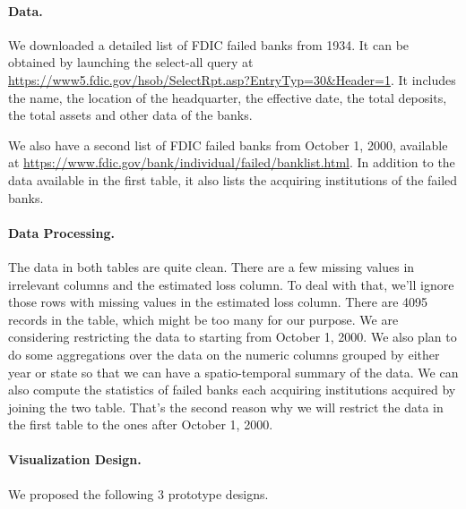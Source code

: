 \documentclass[11pt]{article}
\begin{document}
\paragraph{Data.}
We downloaded a detailed list of FDIC failed banks from 1934. It can be
obtained by launching the select-all query at
\url{https://www5.fdic.gov/hsob/SelectRpt.asp?EntryTyp=30&Header=1}. It
includes the name, the location of the headquarter, the effective date, the
total deposits, the total assets and other data of the banks.

We also have a second list of FDIC failed banks from October 1, 2000, available
at \url{https://www.fdic.gov/bank/individual/failed/banklist.html}. In
addition to the data available in the first table, it also lists the acquiring
institutions of the failed banks.

\paragraph{Data Processing.}
The data in both tables are quite clean. There are a few missing values in
irrelevant columns and the estimated loss column. To deal with that, we'll
ignore those rows with missing values in the estimated loss column. There are
4095 records in the table, which might be too many for our purpose. We are
considering restricting the data to starting from October 1, 2000. We also
plan to do some aggregations over the data on the numeric columns grouped by
either year or state so that we can have a spatio-temporal summary of the
data. We can also compute the statistics of failed banks each acquiring
institutions acquired by joining the two table. That's the second reason why
we will restrict the data in the first table to the ones after October 1,
2000.

\paragraph{Visualization Design.} We proposed the following 3 prototype designs.
\end{document}
